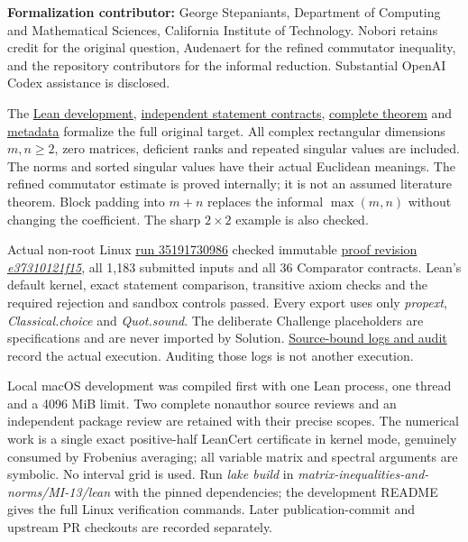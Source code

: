 \documentclass[11pt,a4paper]{article}
\begin{document}
\textbf{Formalization contributor:} George Stepaniants, Department of
Computing and Mathematical Sciences, California Institute of Technology.
Nobori retains credit for the original question, Audenaert for the
refined commutator inequality, and the repository contributors for the
informal reduction. Substantial OpenAI Codex assistance is disclosed.

The
\href{https://github.com/ajt60gaibb/OpenProblemsInNLA/blob/main/matrix-inequalities-and-norms/MI-13/lean/README.md}{Lean
development},
\href{https://github.com/ajt60gaibb/OpenProblemsInNLA/blob/main/matrix-inequalities-and-norms/MI-13/lean/Challenge.lean}{independent
statement contracts},
\href{https://github.com/ajt60gaibb/OpenProblemsInNLA/blob/main/matrix-inequalities-and-norms/MI-13/lean/NLA/MI13/Complete.lean}{complete
theorem} and
\href{https://github.com/ajt60gaibb/OpenProblemsInNLA/blob/main/matrix-inequalities-and-norms/MI-13/lean/formalization.yaml}{metadata}
formalize the full original target. All complex rectangular dimensions
\(m,n\ge2\), zero matrices, deficient ranks and repeated singular values
are included. The norms and sorted singular values have their actual
Euclidean meanings. The refined commutator estimate is proved
internally; it is not an assumed literature theorem. Block padding into
\(m+n\) replaces the informal \(\max(m,n)\) without changing the
coefficient. The sharp \(2\times2\) example is also checked.

Actual non-root Linux
\href{https://github.com/sgstepaniants/OpenProblemsInNLA/actions/runs/35191730986/job/105105676064}{run
35191730986} checked immutable
\href{https://github.com/sgstepaniants/OpenProblemsInNLA/tree/e37310121f154b1a0d94efa4f98fdcd469177134/matrix-inequalities-and-norms/MI-13/lean}{proof
revision \textit{e37310121f15}}, all 1,183 submitted inputs and all 36
Comparator contracts. Lean's default kernel, exact statement comparison,
transitive axiom checks and the required rejection and sandbox controls
passed. Every export uses only \textit{propext},
\textit{Classical.choice} and \textit{Quot.sound}. The deliberate
Challenge placeholders are specifications and are never imported by
Solution.
\href{https://github.com/ajt60gaibb/OpenProblemsInNLA/blob/main/matrix-inequalities-and-norms/MI-13/lean/verification/linux-35191730986/README.md}{Source-bound
logs and audit} record the actual execution. Auditing those logs is not
another execution.

Local macOS development was compiled first with one Lean process, one
thread and a 4096 MiB limit. Two complete nonauthor source reviews and
an independent package review are retained with their precise scopes.
The numerical work is a single exact positive-half LeanCert certificate
in kernel mode, genuinely consumed by Frobenius averaging; all variable
matrix and spectral arguments are symbolic. No interval grid is used.
Run \textit{lake build} in
\textit{matrix-inequalities-and-norms/MI-13/lean} with the pinned
dependencies; the development README gives the full Linux verification
commands. Later publication-commit and upstream PR checkouts are
recorded separately.
\end{document}
